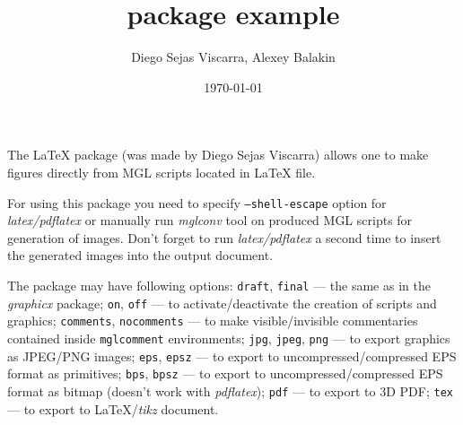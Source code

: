 \documentclass{article}
\title{\mglTeX{} package example}
\author{Diego Sejas Viscarra, Alexey Balakin}
\date{\today}
\begin{document}
  
\maketitle

\noindent The \LaTeX{} package \textsf{\mglTeX} (was made by Diego Sejas Viscarra) allows one to make figures directly from MGL scripts located in \LaTeX{} file. 

For using this package you need to specify \texttt{--shell-escape} option for \emph{latex/pdflatex} or manually run \emph{mglconv} tool on produced MGL scripts for generation of images. Don't forget to run \emph{latex/pdflatex} a second time to insert the generated images into the output document.

The package may have following options: \texttt{draft}, \texttt{final} --- the same as in the \emph{graphicx} package; \texttt{on}, \texttt{off} --- to activate/deactivate the creation of scripts and graphics; \texttt{comments}, \texttt{nocomments} --- to make visible/invisible commentaries contained inside \texttt{mglcomment} environments; \texttt{jpg}, \texttt{jpeg}, \texttt{png} --- to export graphics as JPEG/PNG images; \texttt{eps}, \texttt{epsz} --- to export to uncompressed/compressed EPS format as primitives; \texttt{bps}, \texttt{bpsz} --- to export to uncompressed/compressed EPS format as bitmap (doesn't work with \emph{pdflatex}); \texttt{pdf} --- to export to 3D PDF; \texttt{tex} --- to export to \LaTeX{}/\emph{tikz} document.
\end{document}
